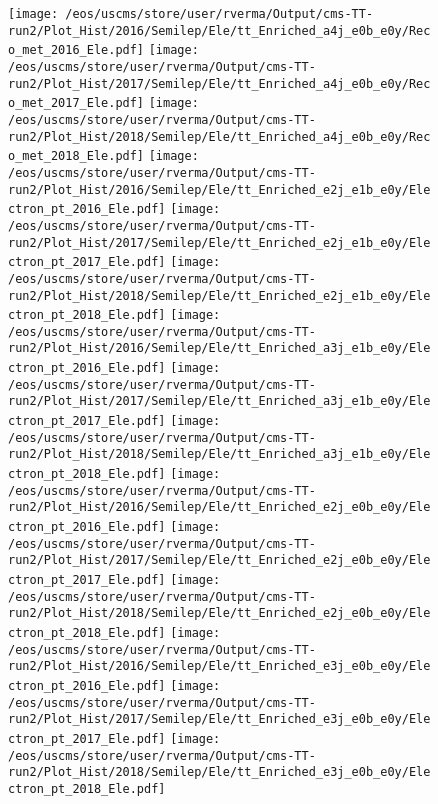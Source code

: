 \begin{figure}
\centering
\texttt{[image: /eos/uscms/store/user/rverma/Output/cms-TT-run2/Plot\_Hist/2016/Semilep/Ele/tt\_Enriched\_a4j\_e0b\_e0y/Reco\_met\_2016\_Ele.pdf]}
\texttt{[image: /eos/uscms/store/user/rverma/Output/cms-TT-run2/Plot\_Hist/2017/Semilep/Ele/tt\_Enriched\_a4j\_e0b\_e0y/Reco\_met\_2017\_Ele.pdf]}
\texttt{[image: /eos/uscms/store/user/rverma/Output/cms-TT-run2/Plot\_Hist/2018/Semilep/Ele/tt\_Enriched\_a4j\_e0b\_e0y/Reco\_met\_2018\_Ele.pdf]}
\texttt{[image: /eos/uscms/store/user/rverma/Output/cms-TT-run2/Plot\_Hist/2016/Semilep/Ele/tt\_Enriched\_e2j\_e1b\_e0y/Electron\_pt\_2016\_Ele.pdf]}
\texttt{[image: /eos/uscms/store/user/rverma/Output/cms-TT-run2/Plot\_Hist/2017/Semilep/Ele/tt\_Enriched\_e2j\_e1b\_e0y/Electron\_pt\_2017\_Ele.pdf]}
\texttt{[image: /eos/uscms/store/user/rverma/Output/cms-TT-run2/Plot\_Hist/2018/Semilep/Ele/tt\_Enriched\_e2j\_e1b\_e0y/Electron\_pt\_2018\_Ele.pdf]}
\texttt{[image: /eos/uscms/store/user/rverma/Output/cms-TT-run2/Plot\_Hist/2016/Semilep/Ele/tt\_Enriched\_a3j\_e1b\_e0y/Electron\_pt\_2016\_Ele.pdf]}
\texttt{[image: /eos/uscms/store/user/rverma/Output/cms-TT-run2/Plot\_Hist/2017/Semilep/Ele/tt\_Enriched\_a3j\_e1b\_e0y/Electron\_pt\_2017\_Ele.pdf]}
\texttt{[image: /eos/uscms/store/user/rverma/Output/cms-TT-run2/Plot\_Hist/2018/Semilep/Ele/tt\_Enriched\_a3j\_e1b\_e0y/Electron\_pt\_2018\_Ele.pdf]}
\texttt{[image: /eos/uscms/store/user/rverma/Output/cms-TT-run2/Plot\_Hist/2016/Semilep/Ele/tt\_Enriched\_e2j\_e0b\_e0y/Electron\_pt\_2016\_Ele.pdf]}
\texttt{[image: /eos/uscms/store/user/rverma/Output/cms-TT-run2/Plot\_Hist/2017/Semilep/Ele/tt\_Enriched\_e2j\_e0b\_e0y/Electron\_pt\_2017\_Ele.pdf]}
\texttt{[image: /eos/uscms/store/user/rverma/Output/cms-TT-run2/Plot\_Hist/2018/Semilep/Ele/tt\_Enriched\_e2j\_e0b\_e0y/Electron\_pt\_2018\_Ele.pdf]}
\texttt{[image: /eos/uscms/store/user/rverma/Output/cms-TT-run2/Plot\_Hist/2016/Semilep/Ele/tt\_Enriched\_e3j\_e0b\_e0y/Electron\_pt\_2016\_Ele.pdf]}
\texttt{[image: /eos/uscms/store/user/rverma/Output/cms-TT-run2/Plot\_Hist/2017/Semilep/Ele/tt\_Enriched\_e3j\_e0b\_e0y/Electron\_pt\_2017\_Ele.pdf]}
\texttt{[image: /eos/uscms/store/user/rverma/Output/cms-TT-run2/Plot\_Hist/2018/Semilep/Ele/tt\_Enriched\_e3j\_e0b\_e0y/Electron\_pt\_2018\_Ele.pdf]}
\end{figure}

